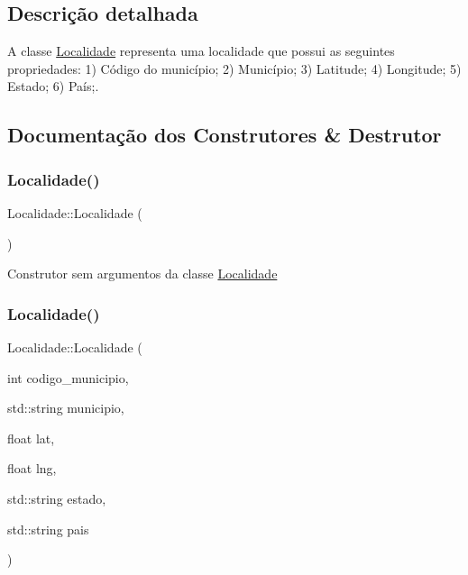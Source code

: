 \subsection{Descrição detalhada}
A classe \hyperlink{classLocalidade}{Localidade} representa uma localidade que possui as seguintes propriedades\+: 1) Código do município; 2) Município; 3) Latitude; 4) Longitude; 5) Estado; 6) País;. 

\subsection{Documentação dos Construtores \& Destrutor}
\mbox{\label{classLocalidade_ae06850bc156d0e7fdc9b04b0a64d14bf}} 
\subsubsection{\texorpdfstring{Localidade()}{Localidade()}\hspace{0.1cm}{\footnotesize\ttfamily [1/2]}}
{\footnotesize\ttfamily Localidade\+::\+Localidade (\begin{DoxyParamCaption}{ }\end{DoxyParamCaption})}

Construtor sem argumentos da classe \hyperlink{classLocalidade}{Localidade}\mbox{\label{classLocalidade_afba433c839d548dac5a04b3ff5e90082}} 
\subsubsection{\texorpdfstring{Localidade()}{Localidade()}\hspace{0.1cm}{\footnotesize\ttfamily [2/2]}}
{\footnotesize\ttfamily Localidade\+::\+Localidade (\begin{DoxyParamCaption}\item[{int}]{codigo\+\_\+municipio,  }\item[{std\+::string}]{municipio,  }\item[{float}]{lat,  }\item[{float}]{lng,  }\item[{std\+::string}]{estado,  }\item[{std\+::string}]{pais }\end{DoxyParamCaption})}

